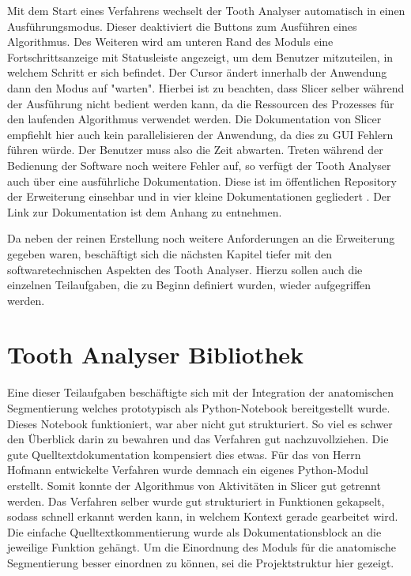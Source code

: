 Mit dem Start eines Verfahrens wechselt der Tooth Analyser automatisch in einen Ausführungsmodus.
Dieser deaktiviert die Buttons zum Ausführen eines Algorithmus. Des Weiteren wird
am unteren Rand des Moduls eine Fortschrittsanzeige mit Statusleiste angezeigt,
um dem Benutzer mitzuteilen, in welchem Schritt er sich befindet. Der Cursor
ändert innerhalb der Anwendung dann den Modus auf "warten". Hierbei ist zu beachten,
dass Slicer selber während der Ausführung nicht bedient werden kann, da die Ressourcen
des Prozesses für den laufenden Algorithmus verwendet werden. Die Dokumentation
von Slicer empfiehlt hier auch kein parallelisieren der Anwendung, da dies zu \ac{GUI}
Fehlern führen würde. Der Benutzer muss also die Zeit abwarten. Treten während
der Bedienung der Software noch weitere Fehler auf, so verfügt der Tooth Analyser
auch über eine ausführliche Dokumentation. Diese ist im öffentlichen Repository
der Erweiterung einsehbar und in vier kleine Dokumentationen gegliedert \citep[vgl.][]{procida2017}.
Der Link zur Dokumentation ist dem Anhang zu entnehmen.

Da neben der reinen Erstellung noch weitere Anforderungen an die Erweiterung
gegeben waren, beschäftigt sich die nächsten Kapitel tiefer mit den softwaretechnischen
Aspekten des Tooth Analyser. Hierzu sollen auch die einzelnen Teilaufgaben, die zu
Beginn definiert wurden, wieder aufgegriffen werden.

\pagebreak

\section{Tooth Analyser Bibliothek}
Eine dieser Teilaufgaben beschäftigte sich mit der Integration der anatomischen Segmentierung
welches prototypisch als Python-Notebook bereitgestellt wurde. Dieses Notebook
funktioniert, war aber nicht gut strukturiert. So viel es schwer den Überblick
darin zu bewahren und das Verfahren gut nachzuvollziehen. Die gute Quelltextdokumentation
kompensiert dies etwas. Für das von Herrn Hofmann entwickelte Verfahren wurde
demnach ein eigenes Python-Modul erstellt. Somit konnte der Algorithmus von Aktivitäten
in Slicer gut getrennt werden. Das Verfahren selber wurde gut strukturiert in
Funktionen gekapselt, sodass schnell erkannt werden kann, in welchem Kontext
gerade gearbeitet wird. Die einfache Quelltextkommentierung wurde als Dokumentationsblock
an die jeweilige Funktion gehängt. Um die Einordnung des Moduls für die
anatomische Segmentierung besser einordnen zu können, sei die Projektstruktur hier
gezeigt.

